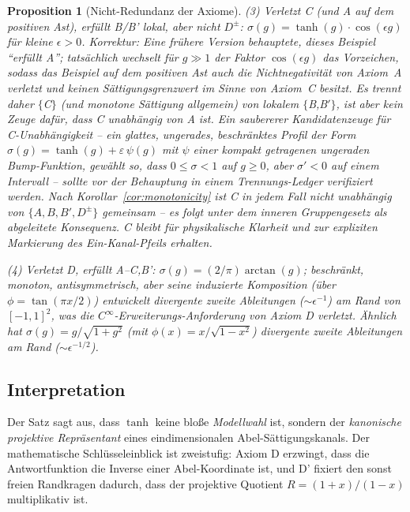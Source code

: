 \documentclass[aps,prd,twocolumn,superscriptaddress,nofootinbib]{revtex4-2}
\newtheorem{proposition}{Proposition}
\begin{document}
\begin{proposition}[Nicht-Redundanz der Axiome]
\textit{(3) Verletzt C (und A auf dem positiven Ast), erfüllt B/B' lokal, aber nicht $D^\pm$:} $\sigma(g) = \tanh(g) \cdot \cos(\epsilon g)$ für kleine $\epsilon > 0$. \emph{Korrektur:} Eine frühere Version behauptete, dieses Beispiel ``erfüllt A''; tatsächlich wechselt für $g \gg 1$ der Faktor $\cos(\epsilon g)$ das Vorzeichen, sodass das Beispiel auf dem positiven Ast auch die Nichtnegativität von Axiom~A verletzt und keinen Sättigungsgrenzwert im Sinne von Axiom~C besitzt. Es trennt daher $\{$C$\}$ (und monotone Sättigung allgemein) von lokalem $\{$B,B$'\}$, ist aber \emph{kein} Zeuge dafür, dass C unabhängig von A ist. Ein saubererer Kandidatenzeuge für C-Unabhängigkeit -- ein glattes, ungerades, beschränktes Profil der Form $\sigma(g) = \tanh(g) + \varepsilon\,\psi(g)$ mit $\psi$ einer kompakt getragenen ungeraden Bump-Funktion, gewählt so, dass $0 \leq \sigma < 1$ auf $g \geq 0$, aber $\sigma' < 0$ auf einem Intervall -- sollte vor der Behauptung in einem Trennungs-Ledger verifiziert werden. Nach Korollar~\ref{cor:monotonicity} ist C in jedem Fall \textit{nicht} unabhängig von $\{A, B, B', D^\pm\}$ gemeinsam -- es folgt unter dem inneren Gruppengesetz als abgeleitete Konsequenz. C bleibt für physikalische Klarheit und zur expliziten Markierung des Ein-Kanal-Pfeils erhalten.

\textit{(4) Verletzt D, erfüllt A--C,B':} $\sigma(g) = (2/\pi)\arctan(g)$; beschränkt, monoton, antisymmetrisch, aber seine induzierte Komposition (über $\phi = \tan(\pi x/2)$) entwickelt divergente zweite Ableitungen ($\sim \epsilon^{-1}$) am Rand von $[-1,1]^2$, was die $C^\infty$-Erweiterungs-Anforderung von Axiom D verletzt. Ähnlich hat $\sigma(g) = g/\sqrt{1+g^2}$ (mit $\phi(x) = x/\sqrt{1-x^2}$) divergente zweite Ableitungen am Rand ($\sim \epsilon^{-1/2}$).
\end{proposition}

\subsection{Interpretation}

Der Satz sagt aus, dass $\tanh$ keine bloße \textit{Modellwahl} ist, sondern der \textit{kanonische projektive Repräsentant} eines eindimensionalen Abel-Sättigungskanals. Der mathematische Schlüsseleinblick ist zweistufig: Axiom D erzwingt, dass die Antwortfunktion die Inverse einer Abel-Koordinate ist, und D' fixiert den sonst freien Randkragen dadurch, dass der projektive Quotient $R=(1+x)/(1-x)$ multiplikativ ist.
\end{document}
